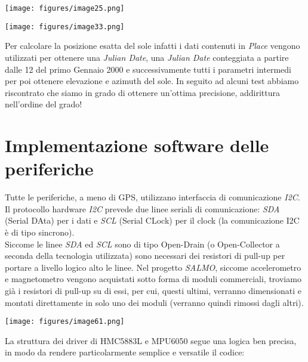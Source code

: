 \begin{center}
\texttt{[image: figures/image25.png]}
\captionsetup{type=figure}
\end{center}

\begin{center}
\texttt{[image: figures/image33.png]}
\captionsetup{type=figure}
\end{center}

\noindent Per calcolare la posizione esatta del sole infatti i dati contenuti in
\emph{Place} vengono utilizzati per ottenere una \emph{Julian Date},
una \emph{Julian Date} conteggiata a partire dalle 12 del primo Gennaio
2000 e successivamente tutti i parametri intermedi per poi ottenere
elevazione e azimuth del sole. In seguito ad alcuni test abbiamo
riscontrato che siamo in grado di ottenere un'ottima precisione,
addirittura nell'ordine del grado!

\hypertarget{implementazione-software-delle-periferiche}{%
\section{Implementazione software delle
periferiche}\label{implementazione-software-delle-periferiche}}

Tutte le periferiche, a meno di GPS, utilizzano interfaccia di
comunicazione \emph{I2C}.\\
Il protocollo hardware \emph{I2C} prevede due linee seriali di
comunicazione: \emph{SDA} (Serial DAta) per i dati e \emph{SCL} (Serial
CLock) per il clock (la comunicazione I2C è di tipo sincrono).\\
Siccome le linee \emph{SDA} ed \emph{SCL} sono di tipo Open-Drain (o
Open-Collector a seconda della tecnologia utilizzata) sono necessari dei
resistori di pull-up per portare a livello logico alto le linee. Nel
progetto \emph{SALMO}, siccome accelerometro e magnetometro vengono
acquistati sotto forma di moduli commerciali, troviamo già i resistori
di pull-up su di essi, per cui, questi ultimi, verranno dimensionati e
montati direttamente in solo uno dei moduli (verranno quindi rimossi
dagli altri).

\begin{center}
\texttt{[image: figures/image61.png]}
\captionsetup{type=figure}
\end{center}

\noindent La struttura dei driver di HMC5883L e MPU6050 segue una logica ben
precisa, in modo da rendere particolarmente semplice e versatile il
codice:

